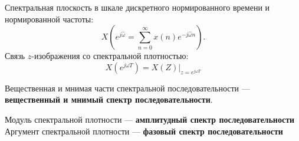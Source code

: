 \documentclass[a4paper, 14pt]{extarticle}
\begin{document}
Спектральная плоскость в шкале дискретного нормированного времени и нормированной частоты:
\begin{equation}
    X(e^{j\hat{ \omega }} = \sum^{\infty}_{n=0} x(n)e^{-j \hat{ \omega }n}).
\end{equation}
Связь $z$-изображения со спектральной плотностью:
\begin{equation}
    X(e^{j\omega T}) = X(Z) \big\vert_{z=e^{j\omega T}}
\end{equation}

Вещественная и мнимая части спектральной последовательности --- \textbf{вещественный и мнимый спектр последовательности}.

Модуль спектральной плотности --- \textbf{амплитудный спектр последовательности}
Аргумент спектральной плотности --- \textbf{фазовый спектр последовательности}
\end{document}
